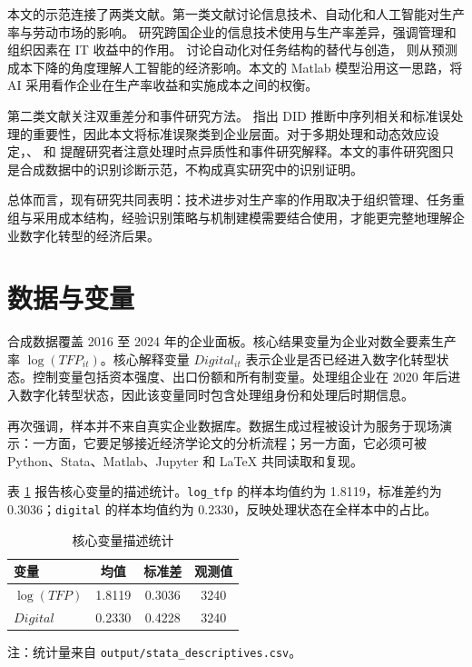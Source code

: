 \documentclass[11pt]{ctexart}
\begin{document}
本文的示范连接了两类文献。第一类文献讨论信息技术、自动化和人工智能对生产率与劳动市场的影响。\citet{BloomSadunVanReenen2012} 研究跨国企业的信息技术使用与生产率差异，强调管理和组织因素在 IT 收益中的作用。\citet{AcemogluRestrepo2019} 讨论自动化对任务结构的替代与创造，\citet{AgrawalGansGoldfarb2019} 则从预测成本下降的角度理解人工智能的经济影响。本文的 Matlab 模型沿用这一思路，将 AI 采用看作企业在生产率收益和实施成本之间的权衡。

第二类文献关注双重差分和事件研究方法。\citet{BertrandDufloMullainathan2004} 指出 DID 推断中序列相关和标准误处理的重要性，因此本文将标准误聚类到企业层面。对于多期处理和动态效应设定，\citet{CallawaySantAnna2021}、\citet{SunAbraham2021} 和 \citet{GoodmanBacon2021} 提醒研究者注意处理时点异质性和事件研究解释。本文的事件研究图只是合成数据中的识别诊断示范，不构成真实研究中的识别证明。

总体而言，现有研究共同表明：技术进步对生产率的作用取决于组织管理、任务重组与采用成本结构，经验识别策略与机制建模需要结合使用，才能更完整地理解企业数字化转型的经济后果。


\section{数据与变量}

合成数据覆盖 2016 至 2024 年的企业面板。核心结果变量为企业对数全要素生产率 $\log(TFP_{it})$。核心解释变量 $Digital_{it}$ 表示企业是否已经进入数字化转型状态。控制变量包括资本强度、出口份额和所有制变量。处理组企业在 2020 年后进入数字化转型状态，因此该变量同时包含处理组身份和处理后时期信息。

再次强调，样本并不来自真实企业数据库。数据生成过程被设计为服务于现场演示：一方面，它要足够接近经济学论文的分析流程；另一方面，它必须可被 Python、Stata、Matlab、Jupyter 和 \LaTeX{} 共同读取和复现。

表 \ref{tab:descriptives} 报告核心变量的描述统计。\texttt{log\_tfp} 的样本均值约为 1.8119，标准差约为 0.3036；\texttt{digital} 的样本均值约为 0.2330，反映处理状态在全样本中的占比。

\begin{table}[htbp]
\centering
\caption{核心变量描述统计}
\label{tab:descriptives}
\begin{tabular}{lccc}
\toprule
变量 & 均值 & 标准差 & 观测值 \\
\midrule
$\log(TFP)$ & 1.8119 & 0.3036 & 3240 \\
$Digital$ & 0.2330 & 0.4228 & 3240 \\
\bottomrule
\end{tabular}
\begin{flushleft}
\footnotesize 注：统计量来自 \texttt{output/stata\_descriptives.csv}。
\end{flushleft}
\end{table}
\end{document}

